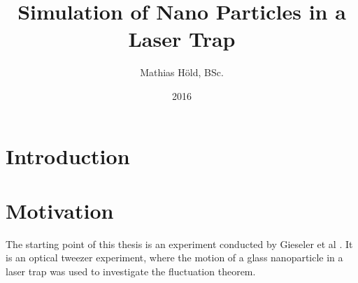\documentclass[12pt]{article}
\begin{document}
\title{Simulation of Nano Particles in a Laser Trap}
\author{Mathias H\"old, BSc.}
\date{2016}
\maketitle
\thispagestyle{empty}
\newpage
\section{Introduction}





\newpage
\section{Motivation}
The starting point of this thesis is an experiment conducted by Gieseler et al \cite{Gieseler2014}. It is an optical tweezer experiment, where the
motion of a glass nanoparticle in a laser trap was used to investigate the fluctuation theorem\cite{Crooks1999}.
\end{document}
